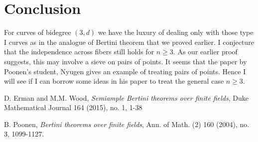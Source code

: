 \documentclass[12pt]{article}
\theoremstyle{plain}
\theoremstyle{definition}
\newcommand{\<}{\langle}
\renewcommand{\>}{\rangle}
\begin{document}
\section{Conclusion}
For curves of bidegree $(3, d)$ we have the luxury of dealing only with those type I curves as in the analogue of Bertini theorem that we proved earlier. I conjecture that the independence across fibers still holds for $n \ge 3$. As our earlier proof suggests, this may involve a sieve on pairs of points. It seems that the paper by Poonen's student, Nyugen gives an example of treating pairs of points. Hence I will see if I can borrow some ideas in his paper to treat the general case $n \ge 3$. 

\begin{thebibliography}{9}
D. Erman and M.M. Wood, \textit{Semiample Bertini theorems over finite fields}, Duke Mathematical Journal 164 (2015), no. 1, 1-38

B. Poonen, \textit{Bertini theorems over finite fields}, Ann. of Math. (2) 160 (2004), no. 3, 1099-1127.
\end{thebibliography}
\end{document}
